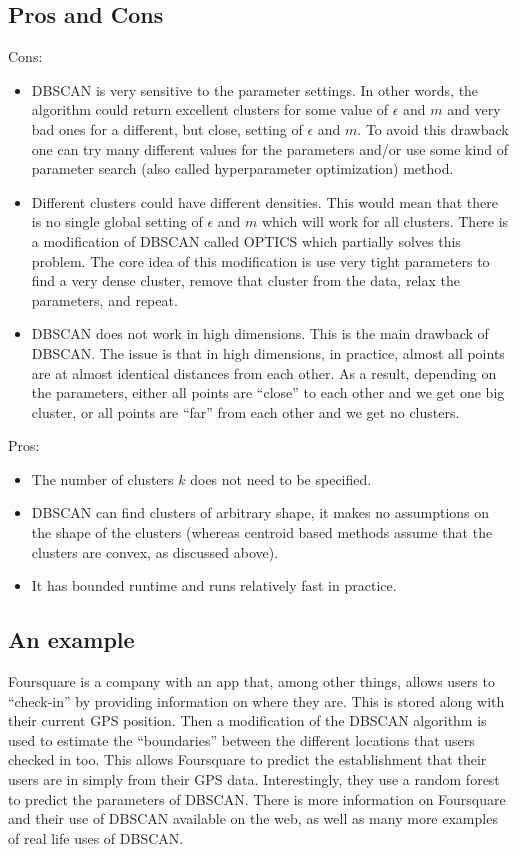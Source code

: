   \subsection{Pros and Cons}
  Cons:
  \begin{itemize}
    \item DBSCAN is very sensitive to the parameter settings. In other words, the algorithm could return excellent clusters for some value of $\epsilon$ and $m$
    and very bad ones for a different, but close, setting of $\epsilon$ and $m$. To avoid this drawback one can try many different values for the parameters and/or use
    some kind of parameter search (also called hyperparameter optimization) method.
    \item Different clusters could have different densities. This would mean that there is no single global setting of $\epsilon$ and $m$ which will work for all clusters.
    There is a modification of DBSCAN called OPTICS which partially solves this problem. The core idea of this modification is use very tight parameters to find a very 
    dense cluster, remove that cluster from the data, relax the parameters, and repeat.
    \item DBSCAN does not work in high dimensions. This is the main drawback of DBSCAN. The issue is that in high dimensions, in practice, almost all points are 
    at almost identical distances from each other. As a result, depending on the parameters, either all points are ``close'' to each other and we get one big 
    cluster, or all points are ``far'' from each other and we get no clusters.
  \end{itemize}
  Pros:
  \begin{itemize}
    \item The number of clusters $k$ does not need to be specified.
    \item DBSCAN can find clusters of arbitrary shape, it makes no assumptions on the shape of the clusters (whereas centroid based methods assume that the clusters are convex, as discussed above).
    \item It has bounded runtime and runs relatively fast in practice.
  \end{itemize}
  
  \subsection{An example}
  Foursquare is a company with an app that, among other things, allows users to ``check-in'' by providing information on where they are. This is stored along with their current GPS position. 
  Then a modification of the DBSCAN algorithm is used to estimate the ``boundaries'' between the different locations that users checked in too. This allows Foursquare to predict the establishment that
  their users are in simply from their GPS data. Interestingly, they use a random forest to predict the parameters of DBSCAN. There is more information on Foursquare and their use of 
  DBSCAN available on the web, as well as many more examples of real life uses of DBSCAN.
  
